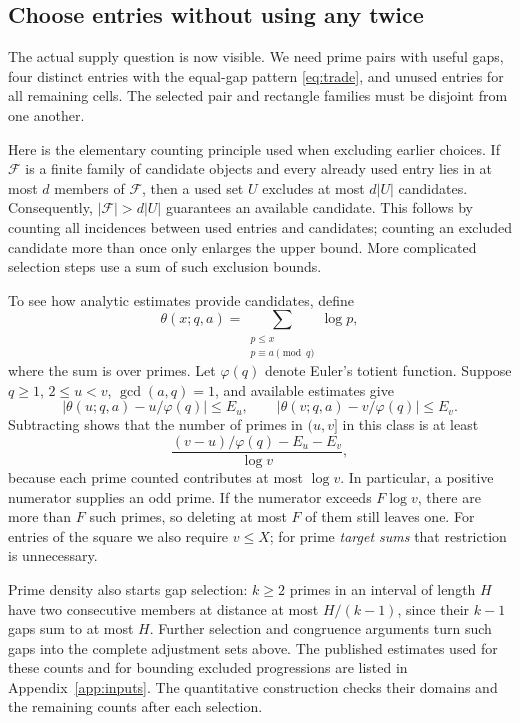 \documentclass[11pt]{article}
\theoremstyle{definition}
\begin{document}
\subsection{Choose entries without using any twice}

The actual supply question is now visible. We need prime pairs with useful
gaps, four distinct entries with the equal-gap pattern \eqref{eq:trade}, and
unused entries for all remaining cells. The selected pair and rectangle
families must be disjoint from one another.

Here is the elementary counting principle used when excluding earlier choices.
If \(\mathcal F\) is a finite family of candidate objects and every already
used entry lies in at most \(d\) members of \(\mathcal F\), then a used set
\(U\) excludes at most \(d|U|\) candidates. Consequently,
\(|\mathcal F|>d|U|\) guarantees an available candidate. This follows by counting
all incidences between used entries and candidates; counting an excluded
candidate more than once only enlarges the upper bound. More complicated
selection steps use a sum of such exclusion bounds.

To see how analytic estimates provide candidates, define
\[
 \theta(x;q,a)=\sum_{\substack{p\le x\\p\equiv a\pmod q}}\log p,
\]
where the sum is over primes. Let \(\varphi(q)\) denote Euler's totient function.
Suppose \(q\ge1\), \(2\le u<v\), \(\gcd(a,q)=1\), and available estimates give
\[
 |\theta(u;q,a)-u/\varphi(q)|\le E_u,\qquad
 |\theta(v;q,a)-v/\varphi(q)|\le E_v.
\]
Subtracting shows that the number of primes in \((u,v]\) in this class is at least
\begin{equation}\label{eq:stock}
 \frac{(v-u)/\varphi(q)-E_u-E_v}{\log v},
\end{equation}
because each prime counted contributes at most \(\log v\). In particular,
a positive numerator supplies an odd prime. If the numerator exceeds
\(F\log v\), there are more than \(F\) such primes, so deleting at most
\(F\) of them still leaves one. For entries of the square we also require
\(v\le X\); for prime \emph{target sums} that restriction is unnecessary.

Prime density also starts gap selection: \(k\ge2\) primes in an interval of
length \(H\) have two consecutive members at distance at most \(H/(k-1)\),
since their \(k-1\) gaps sum to at most \(H\). Further selection and congruence
arguments turn such gaps into the complete adjustment sets above. The
published estimates used for these counts and for bounding excluded
progressions are listed in Appendix~\ref{app:inputs}. The quantitative
construction checks their domains and the remaining counts after each selection.
\end{document}
